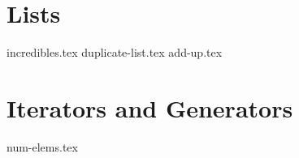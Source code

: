 \documentclass{exam}
\begin{document}
\section{Lists}
\begin{questions}
    {incredibles.tex}
    {duplicate-list.tex}
    {add-up.tex}
\end{questions}

\section{Iterators and Generators}
\begin{questions}
    {num-elems.tex}
\end{questions}
\end{document}
